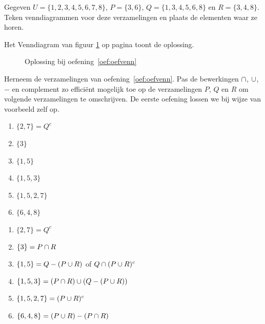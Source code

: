 \begin{oef}
\label{oef:oefvenn}
Gegeven $U = \{1,2,3,4,5,6,7,8\}$, $P = \{3,6\}$,  $Q =\{1,3,4,5,6,8\}$ en $R = \{3,4,8\}$.
Teken  venndiagrammen voor deze verzamelingen en plaats de elementen waar ze horen. 
\begin{opl}
Het Venndiagram van figuur \ref{fig:UPQ} op pagina \pageref{fig:UPQ} toont de oplossing.
\begin{figure}[htbp]
\centering

\caption{Oplossing bij oefening~\ref{oef:oefvenn}}
\label{fig:UPQ}
\end{figure}
\end{opl}
\end{oef}

\begin{oef}
Herneem de verzamelingen van oefening~\ref{oef:oefvenn}. Pas de bewerkingen $\cap$, $\cup$, $-$ en complement zo effici\"ent mogelijk toe op de verzamelingen $P$, $Q$ en $R$ om volgende verzamelingen te omschrijven. De eerste oefening lossen we bij wijze van voorbeeld zelf op.
\begin{enumerate}
  \item $\{2,7\}=Q^c$
  \item $\{3\}$
  \item $\{1,5\}$
  \item $\{1,5,3\}$
  \item $\{1,5,2,7\}$
  \item $\{6,4,8\}$
\end{enumerate}
\begin{opl}
\begin{enumerate}
  \item $\{2,7\}=Q^c$
  \item $\{3\}=P\cap R$
  \item $\{1,5\}=Q-(P\cup R)$ of $Q \cap (P \cup R)^c$
  \item $\{1,5,3\}=(P\cap R)\cup (Q-(P\cup R))$
  \item $\{1,5,2,7\}=(P\cup R)^c$
  \item $\{6,4,8\}=(P\cup R)- (P \cap R)$
\end{enumerate}
\end{opl}
\end{oef}


